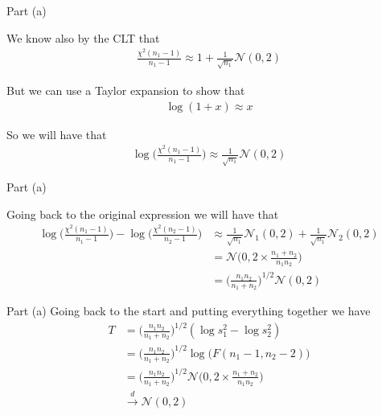 \begin{frame}{Part (a)}

    We know also by the CLT that
    \begin{align*}
        \frac{\chi^2 (n_1 - 1)}{n_1 - 1} \approx 1 + \frac{1}{\sqrt{n_1}} \mathcal{N}(0, 2)
    \end{align*}

    But we can use a Taylor expansion to show that
    \begin{align*}
        \log (1 + x) \approx x    
    \end{align*}

    So we will have that
    \begin{align*}
        \log \Biggr( \frac{\chi^2(n_1 - 1)}{n_1 - 1} \Biggr) \approx \frac{1}{\sqrt{n_1}} \mathcal{N}(0, 2)
    \end{align*}
    
\end{frame}

\begin{frame}{Part (a)}

    Going back to the original expression we will have that
    \begin{align*}
        \log \Biggr( \frac{\chi^2(n_1 - 1)}{n_1 - 1} \Biggr) - \log \Biggr( \frac{\chi^2(n_2 - 1)}{n_2 - 1} \Biggr) &\approx \frac{1}{\sqrt{n_1}} \mathcal{N}_1(0, 2) + \frac{1}{\sqrt{n_1}} \mathcal{N}_2(0, 2)
        \\
        &= \mathcal{N} \Biggr( 0, 2 \times \frac{n_1 + n_2}{n_1 n_2} \Biggr)
        \\
        &= \Biggr( \frac{n_1 n_2}{n_1 + n_2} \Biggr)^{1/2} \mathcal{N} (0, 2)
    \end{align*}
    
\end{frame}

\begin{frame}{Part (a)}
    Going back to the start and putting everything together we have
    \begin{align*}
        T &= \Biggr( \frac{n_1 n_2}{n_1 + n_2} \Biggr)^{1/2} (\log s_1^2 - \log s_2^2)
        \\
        &= \Biggr( \frac{n_1 n_2}{n_1 + n_2} \Biggr)^{1/2} \log \Biggr( F(n_1 - 1, n_2 - 2) \Biggr)
        \\
        &= \Biggr( \frac{n_1 n_2}{n_1 + n_2} \Biggr)^{1/2} \mathcal{N} \Biggr( 0, 2 \times \frac{n_1 + n_2}{n_1 n_2} \Biggr)
        \\
        &\xrightarrow{d} \mathcal{N} (0, 2)
    \end{align*}
    
\end{frame}


